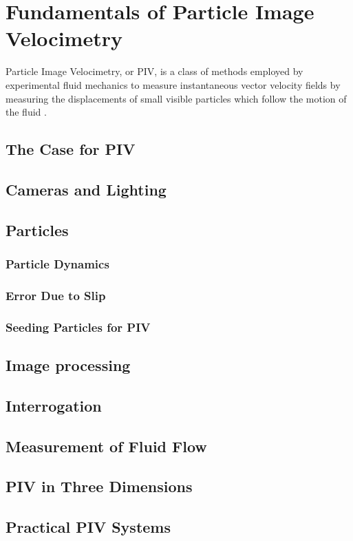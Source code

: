 \section{Fundamentals of Particle Image Velocimetry}

Particle Image Velocimetry, or PIV, is a class of methods employed by 
experimental fluid mechanics to measure instantaneous vector velocity fields by 
measuring the displacements of small visible particles which follow the motion 
of the fluid \cite{adrian2011}. 

 
\subsection{The Case for PIV}

\subsection{Cameras and Lighting}

\subsection{Particles}

\subsubsection{Particle Dynamics} 

\subsubsection{Error Due to Slip}

\subsubsection{Seeding Particles for PIV}

\subsection{Image processing}

\subsection{Interrogation}

\subsection{Measurement of Fluid Flow}

\subsection{PIV in Three Dimensions}

\subsection{Practical PIV Systems}


